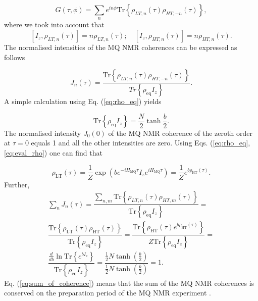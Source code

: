 \begin{equation}
    \label{eq:signal_series}
    G(\tau, \phi) = \sum\limits_n 
    e^{in\phi}\mathrm{Tr} \left\{
    \rho_{LT, n}(\tau) \rho_{HT, -n} (\tau)
    \right\},
\end{equation}
where we took into account that
\begin{equation}
    \left[I_z, \rho_{LT, n} (\tau) \right] = n  \rho_{LT, n} (\tau);
    \quad 
    \left[I_z, \rho_{HT, n} (\tau) \right] = n  \rho_{HT, n} (\tau).
\end{equation}
The normalised intensities of the MQ NMR coherences can be expressed as follows 

\begin{equation}
    \label{eq:coherence}
    J_n(\tau) = 
    \dfrac{
       \mathrm{Tr} \left\{
        \rho_{LT, n}(\tau) \rho_{HT, -n} (\tau)
        \right\}
    }{Tr \left\{\rho_{\mathrm{eq}}I_z\right\}}.
\end{equation}
A simple calculation using Eq.   (\ref{eq:rho_eq}) yields \cite{lab:low_temp_dyn_1997}

\begin{equation}
   \mathrm{Tr} \left\{\rho_{\mathrm{eq}}I_z\right\} = 
    \frac N 2 \tanh \frac b 2.
\end{equation}
The normalised intensity $J_0(0)$ of the MQ NMR coherence of the zeroth order at $\tau=0$ equals 1 and all the other intensities are zero. Using Eqs.   (\ref{eq:rho_eq}, \ref{eq:eval_rho}) one can find that

\begin{equation}
    \rho_\mathrm{LT}(\tau) = \dfrac 1 Z 
    \exp\left(be^{-iH_\mathrm{MQ}\tau} I_z e^{iH_\mathrm{MQ}\tau}\right) =
    \dfrac 1 Z e^{b\rho_\mathrm{HT}(\tau)}.
\end{equation}
Further,
\begin{multline}
    \label{eq:sum_of_coherence}
    \sum\limits_n J_n(\tau) = 
    \dfrac{\sum\limits_{n, m}\mathrm{Tr}\left\{
        \rho_{LT, n}(\tau)\rho_{HT, m}(\tau)
    \right\}}
    {\mathrm{Tr}\left\{\rho_\mathrm{eq} I_z\right\}} = \\
    \dfrac{\mathrm{Tr}\left\{
        \rho_\mathrm{LT}(\tau)\rho_\mathrm{HT}(\tau)
    \right\}}
    {\mathrm{Tr}\left\{\rho_\mathrm{eq} I_z\right\}} = 
    \dfrac{\mathrm{Tr}\left\{
        \rho_\mathrm{HT}(\tau)e^{b\rho_\mathrm{HT}(\tau)}
    \right\}}
    {Z\mathrm{Tr}\left\{\rho_\mathrm{eq} I_z\right\}} = \\
    \dfrac{\frac{d}{db} \ln \mathrm{Tr}\left\{
        e^{b I_z}
    \right\}}
    {\mathrm{Tr}\left\{\rho_\mathrm{eq} I_z\right\}} = 
    \dfrac{\frac 1 2 N \tanh \left( \frac b 2 \right)}
    {\frac 1 2 N \tanh \left( \frac b 2 \right)} = 1.
\end{multline}
Eq.   (\ref{eq:sum_of_coherence}) means that the sum of the MQ NMR coherences is conserved on the preparation period of the MQ NMR experiment \cite{mq_nmr_experiment}.

